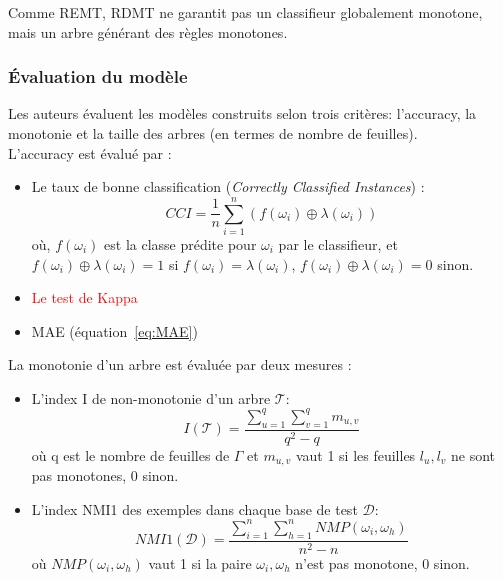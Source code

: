 \documentclass[a4paper]{article}
\renewcommand{\eqref}[1]{équation~\ref{#1}}
\begin{document}
\noindent Comme REMT, RDMT ne garantit pas un classifieur globalement monotone, mais
un arbre générant des règles monotones.  \\

\subsubsection{Évaluation du modèle}

Les auteurs évaluent les modèles construits selon trois critères: l'accuracy, la monotonie et la taille des arbres (en termes de nombre de
feuilles). \\
\noindent L'accuracy est évalué par :
\begin{itemize}
    \item Le taux de bonne classification (\emph{Correctly Classified
        Instances}) :
        \begin{equation}
            CCI = \frac{1}{n} \sum_{i=1}^{n} (f(\omega_i) \oplus
            \lambda(\omega_i))
        \label{eq:cci}
        \end{equation}
        où, $f(\omega_i)$ est la classe prédite pour $\omega_i$ par le
        classifieur, et $f(\omega_i) \oplus \lambda(\omega_i) = 1$ si $f(\omega_i) =
        \lambda(\omega_i)$, $f(\omega_i) \oplus \lambda(\omega_i) = 0$ sinon. 
    \item \textcolor{red}{Le test de Kappa} %
    \item MAE (\eqref{eq:MAE})
\end{itemize}

\noindent La monotonie d'un arbre est évaluée par deux mesures :
\begin{itemize}
    \item L'index I de non-monotonie d'un arbre $\mathcal{T}$:  
        \begin{equation}
            I(\mathcal{T}) = \frac{\sum_{u=1}^q \sum_{v=1}^{q} m_{u,v}}{q^2 - q}
        \end{equation}
        où q est le nombre de feuilles de $\Gamma$ et $m_{u,v}$ vaut 1 si les
        feuilles $l_u, l_v$ ne sont pas monotones, 0 sinon.
    \item L'index NMI1 des exemples dans chaque base de test $\mathcal{D}$:
        \begin{equation}
            NMI1(\mathcal{D}) = \frac{\sum_{i=1}^n \sum_{h=1}^{n} NMP(\omega_i,
            \omega_h)}{n^2 - n}
        \end{equation}
        où $NMP(\omega_i, \omega_h)$ vaut 1 si la paire $\omega_i, \omega_h$
        n'est pas monotone, 0 sinon. \\
\end{itemize}
\end{document}
